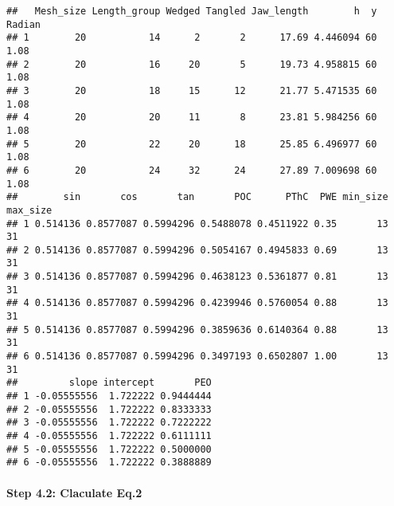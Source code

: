 \documentclass[]{article}
\newenvironment{Shaded}{\begin{snugshade}}{\end{snugshade}}
\newcommand{\KeywordTok}[1]{\textcolor[rgb]{0.13,0.29,0.53}{\textbf{#1}}}
\newcommand{\CommentTok}[1]{\textcolor[rgb]{0.56,0.35,0.01}{\textit{#1}}}
\newcommand{\OperatorTok}[1]{\textcolor[rgb]{0.81,0.36,0.00}{\textbf{#1}}}
\newcommand{\NormalTok}[1]{#1}
\let\oldparagraph\paragraph
\renewcommand{\paragraph}[1]{\oldparagraph{#1}\mbox{}}
\begin{document}
\begin{verbatim}
##   Mesh_size Length_group Wedged Tangled Jaw_length        h  y Radian
## 1        20           14      2       2      17.69 4.446094 60   1.08
## 2        20           16     20       5      19.73 4.958815 60   1.08
## 3        20           18     15      12      21.77 5.471535 60   1.08
## 4        20           20     11       8      23.81 5.984256 60   1.08
## 5        20           22     20      18      25.85 6.496977 60   1.08
## 6        20           24     32      24      27.89 7.009698 60   1.08
##        sin       cos       tan       POC      PThC  PWE min_size max_size
## 1 0.514136 0.8577087 0.5994296 0.5488078 0.4511922 0.35       13       31
## 2 0.514136 0.8577087 0.5994296 0.5054167 0.4945833 0.69       13       31
## 3 0.514136 0.8577087 0.5994296 0.4638123 0.5361877 0.81       13       31
## 4 0.514136 0.8577087 0.5994296 0.4239946 0.5760054 0.88       13       31
## 5 0.514136 0.8577087 0.5994296 0.3859636 0.6140364 0.88       13       31
## 6 0.514136 0.8577087 0.5994296 0.3497193 0.6502807 1.00       13       31
##         slope intercept       PEO
## 1 -0.05555556  1.722222 0.9444444
## 2 -0.05555556  1.722222 0.8333333
## 3 -0.05555556  1.722222 0.7222222
## 4 -0.05555556  1.722222 0.6111111
## 5 -0.05555556  1.722222 0.5000000
## 6 -0.05555556  1.722222 0.3888889
\end{verbatim}

\paragraph{Step 4.2: Claculate Eq.2}\label{step-4.2-claculate-eq.2}

\begin{Shaded}
\end{Shaded}
\end{document}
